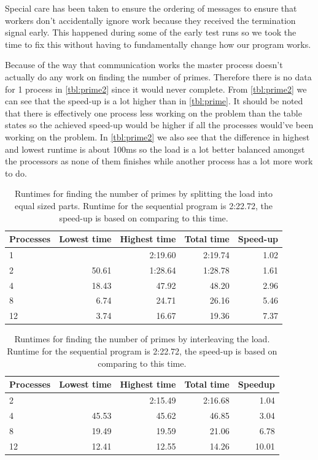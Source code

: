 \documentclass[a4paper]{article}
\begin{document}
\begin{enumerate}[(a)]
	Special care has been taken to ensure the ordering of messages to ensure that workers don't accidentally ignore work because they received the termination signal early. This happened during some of the early test runs so we took the time to fix this without having to fundamentally change how our program works.
	
	Because of the way that communication works the master process doesn't actually do any work on finding the number of primes. Therefore there is no data for 1 process in \autoref{tbl:prime2} since it would never complete. From \autoref{tbl:prime2} we can see that the speed-up is a lot higher than in \autoref{tbl:prime}. It should be noted that there is effectively one process less working on the problem than the table states so the achieved speed-up would be higher if all the processes would've been working on the problem. In \autoref{tbl:prime2} we also see that the difference in highest and lowest runtime is about 100ms so the load is a lot better balanced amongst the processors as none of them finishes while another process has a lot more work to do.
\end{enumerate}

\begin{table}[h]
	\centering
	\caption{Runtimes for finding the number of primes by splitting the load into equal sized parts. Runtime for the sequential program is 2:22.72, the speed-up is based on comparing to this time.}
	\label{tbl:prime}
	\begin{tabular}{l|r|r|r|r}
		Processes & Lowest time & Highest time & Total time & Speed-up \\ \hline
		 1 &  & 2:19.60 & 2:19.74 & 1.02 \\
		 2 & 50.61 & 1:28.64 & 1:28.78 & 1.61 \\
		 4 & 18.43 & 47.92 & 48.20 & 2.96 \\
		 8 &  6.74 & 24.71 & 26.16 & 5.46 \\
		12 &  3.74 & 16.67 & 19.36 & 7.37 \\
	\end{tabular}
\end{table}

\begin{table}[h]
	\centering
	\caption{Runtimes for finding the number of primes by interleaving the load. Runtime for the sequential program is 2:22.72, the speed-up is based on comparing to this time.}
	\label{tbl:prime2}
	\begin{tabular}{l|r|r|r|r}
		Processes & Lowest time & Highest time & Total time & Speedup \\ \hline
		 2 &    & 2:15.49 & 2:16.68 & 1.04 \\
	 	 4 & 45.53 & 45.62 & 46.85 & 3.04 \\
	 	 8 & 19.49 & 19.59 & 21.06 & 6.78 \\
		12 & 12.41 & 12.55 & 14.26 & 10.01 \\
	\end{tabular}
\end{table}
\end{document}
